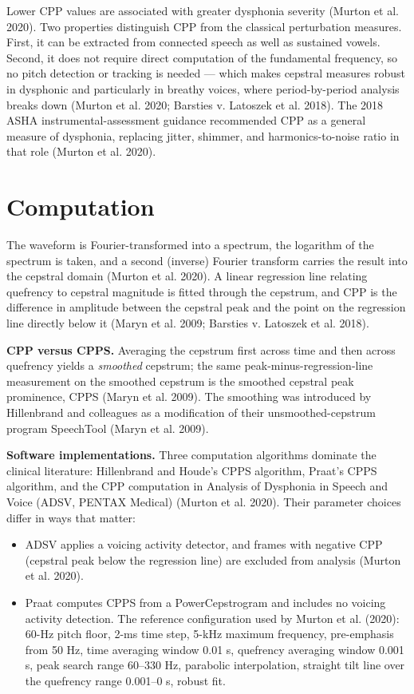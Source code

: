 \documentclass[
  english,
  letterpaper,
]{scrbook}
\providecommand{\tightlist}{%
  \setlength{\itemsep}{0pt}\setlength{\parskip}{0pt}}
\begin{document}
Lower CPP values are associated with greater dysphonia severity (Murton
et al. 2020). Two properties distinguish CPP from the classical
perturbation measures. First, it can be extracted from connected speech
as well as sustained vowels. Second, it does not require direct
computation of the fundamental frequency, so no pitch detection or
tracking is needed --- which makes cepstral measures robust in dysphonic
and particularly in breathy voices, where period-by-period analysis
breaks down (Murton et al. 2020; Barsties v. Latoszek et al. 2018). The
2018 ASHA instrumental-assessment guidance recommended CPP as a general
measure of dysphonia, replacing jitter, shimmer, and harmonics-to-noise
ratio in that role (Murton et al. 2020).

\section{Computation}\label{computation}

The waveform is Fourier-transformed into a spectrum, the logarithm of
the spectrum is taken, and a second (inverse) Fourier transform carries
the result into the cepstral domain (Murton et al. 2020). A linear
regression line relating quefrency to cepstral magnitude is fitted
through the cepstrum, and CPP is the difference in amplitude between the
cepstral peak and the point on the regression line directly below it
(Maryn et al. 2009; Barsties v. Latoszek et al. 2018).

\textbf{CPP versus CPPS.} Averaging the cepstrum first across time and
then across quefrency yields a \emph{smoothed} cepstrum; the same
peak-minus-regression-line measurement on the smoothed cepstrum is the
smoothed cepstral peak prominence, CPPS (Maryn et al. 2009). The
smoothing was introduced by Hillenbrand and colleagues as a modification
of their unsmoothed-cepstrum program SpeechTool (Maryn et al. 2009).

\textbf{Software implementations.} Three computation algorithms dominate
the clinical literature: Hillenbrand and Houde's CPPS algorithm, Praat's
CPPS algorithm, and the CPP computation in Analysis of Dysphonia in
Speech and Voice (ADSV, PENTAX Medical) (Murton et al. 2020). Their
parameter choices differ in ways that matter:

\begin{itemize}
\tightlist
\item
  ADSV applies a voicing activity detector, and frames with negative CPP
  (cepstral peak below the regression line) are excluded from analysis
  (Murton et al. 2020).
\item
  Praat computes CPPS from a PowerCepstrogram and includes no voicing
  activity detection. The reference configuration used by Murton et al.
  (2020): 60-Hz pitch floor, 2-ms time step, 5-kHz maximum frequency,
  pre-emphasis from 50 Hz, time averaging window 0.01 s, quefrency
  averaging window 0.001 s, peak search range 60--330 Hz, parabolic
  interpolation, straight tilt line over the quefrency range 0.001--0 s,
  robust fit.
\end{itemize}
\end{document}
